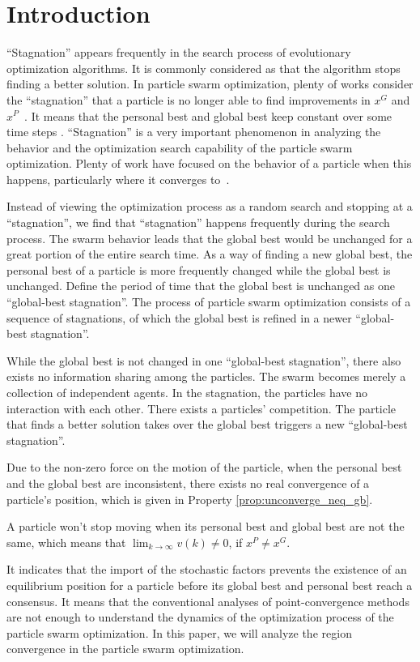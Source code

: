 \section{Introduction}
\label{sec:introduction}

``Stagnation'' appears frequently in the search process of evolutionary optimization algorithms. 
It is commonly considered as that the algorithm stops finding a better solution.
In particle swarm optimization,
plenty of works consider the ``stagnation'' that a particle is no longer able to find improvements in $ x^{G} $ and $ x^{P} $~\cite{Clerc06stagnationanalysis}.
It means that the personal best and global best keep constant over some time steps \cite{4223160}.
``Stagnation'' is a very important phenomenon in analyzing the behavior and the optimization search capability of the particle swarm optimization.
Plenty of work have focused on the behavior of a particle when this happens, particularly where it converges to~\cite{Schmitt:2013:PSO:2463372.2463563}\cite{Poli:2008:DSS:1384929.1384944}.

Instead of viewing the optimization process as a random search and stopping at a ``stagnation'', we find that ``stagnation'' happens frequently during the search process.
The swarm behavior leads that the global best would be unchanged for a great portion of the entire search time.
As a way of finding a new global best, the personal best of a particle is more frequently changed while the global best is unchanged. 
Define the period of time that the global best is unchanged as one ``global-best stagnation''.
The process of particle swarm optimization consists of a sequence of stagnations, of which the global best is refined in a newer ``global-best stagnation''.

While the global best is not changed in one ``global-best stagnation'', there also exists no information sharing among the particles.
The swarm becomes merely a collection of independent agents.
In the stagnation, the particles have no interaction with each other.
There exists a particles' competition.
The particle that finds a better solution takes over the global best triggers a new ``global-best stagnation''.

Due to the non-zero force on the motion of the particle, when the personal best and the global best are inconsistent, there exists no real convergence of a particle's position, which is given in Property \ref{prop:unconverge_neq_gb}.
\begin{myprop}
\label{prop:unconverge_neq_gb}
A particle won't stop moving when its personal best and global best are not the same, 
which means that 
$ \lim_{k \rightarrow \infty} v(k) \neq 0 $, if $ x^{P} \neq x^{G} $.
\end{myprop}
It indicates that the import of the stochastic factors prevents the existence of an equilibrium position for a particle before its global best and personal best reach a consensus.
It means that the conventional analyses of point-convergence methods are not enough to understand the dynamics of the optimization process of the particle swarm optimization.
In this paper, we will analyze the region convergence in the particle swarm optimization.